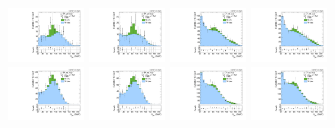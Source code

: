 \begin{figure}[htbp]
  \includegraphics[width=0.18\textwidth]{fig/fitValidation/PostFit_SR_MJJ_MVV0700to1000__mu_HP_vbf_LDy_Run2.pdf}
  \includegraphics[width=0.18\textwidth]{fig/fitValidation/PostFit_SR_MJJ_MVV0700to1000__e_HP_vbf_LDy_Run2.pdf}
  \includegraphics[width=0.18\textwidth]{fig/fitValidation/PostFit_SR_MJJ_MVV0700to1000__mu_LP_vbf_LDy_Run2.pdf}
  \includegraphics[width=0.18\textwidth]{fig/fitValidation/PostFit_SR_MJJ_MVV0700to1000__e_LP_vbf_LDy_Run2.pdf}\\
  \includegraphics[width=0.18\textwidth]{fig/fitValidation/PostFit_SR_MJJ_MVV0700to1000__mu_HP_bb_HDy_Run2.pdf}
  \includegraphics[width=0.18\textwidth]{fig/fitValidation/PostFit_SR_MJJ_MVV0700to1000__e_HP_bb_HDy_Run2.pdf}
  \includegraphics[width=0.18\textwidth]{fig/fitValidation/PostFit_SR_MJJ_MVV0700to1000__mu_LP_bb_HDy_Run2.pdf}
  \includegraphics[width=0.18\textwidth]{fig/fitValidation/PostFit_SR_MJJ_MVV0700to1000__e_LP_bb_HDy_Run2.pdf}\\

\end{figure}

